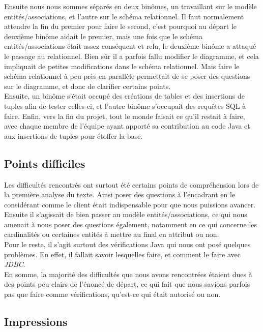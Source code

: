 \documentclass[10pt]{article}
\begin{document}
Ensuite nous nous sommes séparés en deux binômes, un travaillant sur le modèle entités/associations, et l'autre sur le schéma relationnel.
Il faut normalement attendre la fin du premier pour faire le second, c'est pourquoi au départ le deuxième binôme aidait le premier, mais
une fois que le schéma entités/associations était assez conséquent et relu, le deuxième binôme a attaqué le passage au relationnel.
Bien sûr il a parfois fallu modifier le diagramme, et cela impliquait de petites modifications dans le schéma relationnel. Mais faire
le schéma relationnel à peu près en parallèle permettait de se poser des questions sur le diagramme, et donc de clarifier certains
points.\\

Ensuite, un binôme s'était occupé des créations de tables et des insertions de tuples afin de tester celles-ci, et l'autre binôme 
s'occupait des requêtes SQL à faire. Enfin, vers la fin du projet, tout le monde faisait ce qu'il restait à faire, avec chaque membre
de l'équipe ayant apporté sa contribution au code Java et aux insertions de tuples pour étoffer la base.

\subsection{Points difficiles}

Les difficultés rencontrés ont surtout été certains points de compréhension lors de la première analyse du texte. Ainsi poser des questions
à l'encadrant en le considérant comme le client était indispensable pour que nous puissions avancer. \\

Ensuite il s'agissait de bien passer au modèle entités/associations, ce qui nous amenait à nous poser des questions également, notamment
en ce qui concerne les cardinalités ou certaines entités à mettre au final en attribut ou non. \\

Pour le reste, il s'agit surtout des vérifications Java qui nous ont posé quelques problèmes. En effet, il fallait savoir lesquelles
faire, et comment le faire avec \emph{JDBC}. \\

En somme, la majorité des difficultés que nous avons rencontrées étaient dues à des points peu clairs de l'énoncé de départ, ce qui fait
que nous savions parfois pas que faire comme vérifications, qu'est-ce qui était autorisé ou non.

\subsection{Impressions}
\end{document}
